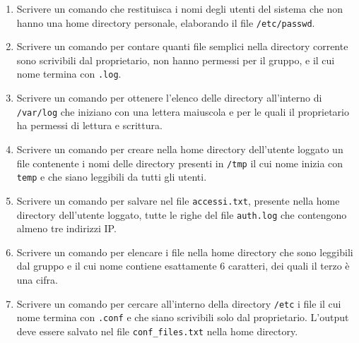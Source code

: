 \documentclass{report}
\begin{document}
\begin{enumerate}
    \item Scrivere un comando che restituisca i nomi degli utenti del sistema che non hanno una home directory personale, elaborando il file \texttt{/etc/passwd}.
    
    \item Scrivere un comando per contare quanti file semplici nella directory corrente sono scrivibili dal proprietario, non hanno permessi per il gruppo, e il cui nome termina con \texttt{.log}.
    
    \item Scrivere un comando per ottenere l’elenco delle directory all’interno di \texttt{/var/log} che iniziano con una lettera maiuscola e per le quali il proprietario ha permessi di lettura e scrittura.
    
    \item Scrivere un comando per creare nella home directory dell’utente loggato un file contenente i nomi delle directory presenti in \texttt{/tmp} il cui nome inizia con \texttt{temp} e che siano leggibili da tutti gli utenti.
    
    \item Scrivere un comando per salvare nel file \texttt{accessi.txt}, presente nella home directory dell’utente loggato, tutte le righe del file \texttt{auth.log} che contengono almeno tre indirizzi IP.
    
    \item Scrivere un comando per elencare i file nella home directory che sono leggibili dal gruppo e il cui nome contiene esattamente 6 caratteri, dei quali il terzo è una cifra.
    
    \item Scrivere un comando per cercare all’interno della directory \texttt{/etc} i file il cui nome termina con \texttt{.conf} e che siano scrivibili solo dal proprietario. L’output deve essere salvato nel file \texttt{conf\_files.txt} nella home directory.
\end{enumerate}
\end{document}
